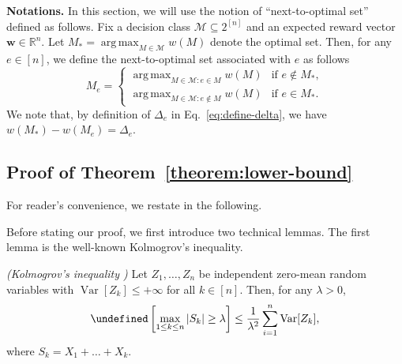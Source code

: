 \documentclass{article}
\newcommand{\M}{\mathcal M}
\newcommand{\RR}{\mathbb R}
\DeclareMathOperator{\Var}{Var}
\DeclareMathOperator*{\argmax}{arg\,max}
\let\Pr\undefined
\DeclareMathOperator{\Pr}{Pr}
\renewcommand{\vec}[1]{\boldsymbol{#1}}
\begin{document}
\textbf{Notations.} In this section, we will use the notion of ``next-to-optimal set'' defined as follows. 
Fix a decision class $\M\subseteq 2^{[n]}$ and an expected reward vector $\vec w\in \RR^n$.
Let $M_*  =\argmax_{M\in \M} w(M)$ denote the optimal set.
Then, for any $e\in [n]$, we define the next-to-optimal set associated with $e$ as follows
\begin{equation}
\label{eq:next-to-optimal}
M_e = \begin{cases}
		 \argmax_{M\in \M: e \in M} w(M) & \text{if } e\not \in M_*, \\
	     \argmax_{M\in \M: e \not\in M} w(M) & \text{if } e\in M_*.
	  \end{cases}
\end{equation}
We note that, by definition of $\Delta_e$ in Eq.~\eqref{eq:define-delta}, we have
$w(M_*)-w(M_e) = \Delta_e$.


\subsection{Proof of Theorem~\ref{theorem:lower-bound}}
For reader's convenience, we restate  in the following.
\lowerbound*

Before stating our proof, we first introduce two technical lemmas.
The first lemma is the well-known Kolmogrov's inequality.
\begin{lemma}\emph{(Kolmogrov's inequality \citep[Corollary 7.66]{ross1996stochastic})}
\label{lemma:kolmogrov}
Let $Z_1,\ldots, Z_n$ be independent zero-mean random variables with $\Var[Z_k] \le +\infty$ for all $k\in [n]$.
Then, for any $\lambda > 0$,
$$
\Pr\left[\max_{1\le k \le n} |S_k| \ge \lambda \right]
\le \frac{1}{\lambda^2} \sum_{i=1}^n \Var[Z_k],
$$
where $S_k = X_1+\ldots+X_k$.
\end{lemma}
\end{document}
